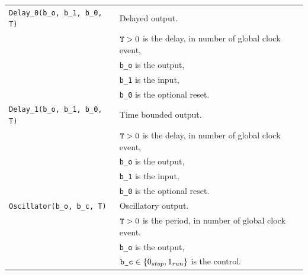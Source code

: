 \documentclass[a4]{article} \usepackage[left=2cm,right=3cm,top=1cm,bottom=2cm]{geometry}
\begin{document}
{\begin{tabular}{ll}
  {\tt Delay\_0(b\_o, b\_1, b\_0, T)} & Delayed output. \\& $\mbox{{\tt T}} > 0$ is the delay, in number of global clock event, \\& {\tt b\_o} is the  output, \\& {\tt b\_1} is the input, \\& {\tt b\_0} is the optional reset.\\
  {\tt Delay\_1(b\_o, b\_1, b\_0, T)} & Time bounded output. \\& $\mbox{{\tt T}} > 0$ is the delay, in number of global clock event, \\& {\tt b\_o} is the  output, \\& {\tt b\_1} is the input, \\& {\tt b\_0} is the optional reset.\\
  {\tt Oscillator(b\_o, b\_c, T)} & Oscillatory output. \\& $\mbox{{\tt T}} > 0$ is the period, in number of global clock event. \\& {\tt b\_o} is the  output, \\& $\mbox{{\tt b\_c}} \in \{0_{stop}, 1_{run}\}$ is the control.\\
\end{tabular}}
\end{document}

